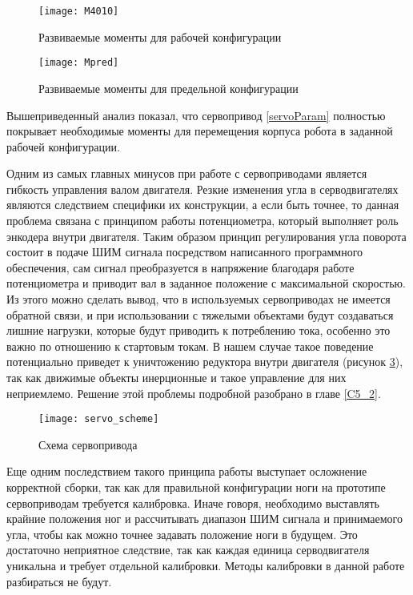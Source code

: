 \begin{figure}[h!]
	\begin{center}
		\texttt{[image: M4010]}
		\caption{Развиваемые моменты для рабочей конфигурации}
		\label{M4010}
	\end{center}
\end{figure}

\begin{figure}[h!]
	\begin{center}
		\texttt{[image: Mpred]}
		\caption{Развиваемые моменты для предельной конфигурации}
		\label{Mpred}
	\end{center}
\end{figure}


Вышеприведенный анализ показал, что сервопривод \ref{servoParam} полностью покрывает необходимые моменты для перемещения корпуса робота в заданной рабочей конфигурации.
 
Одним из самых главных минусов при работе с сервоприводами является гибкость управления валом двигателя. Резкие изменения угла в серводвигателях являются следствием специфики их конструкции, а если быть точнее, то данная проблема связана с принципом работы потенциометра, который выполняет роль энкодера внутри двигателя. Таким образом принцип регулирования угла поворота состоит в подаче ШИМ сигнала посредством написанного программного обеспечения, сам сигнал преобразуется в напряжение благодаря работе потенциометра и приводит вал в заданное положение с максимальной скоростью. Из этого можно сделать вывод, что в используемых  сервоприводах не имеется обратной связи, и при использовании с тяжелыми объектами будут создаваться лишние нагрузки, которые будут приводить к потреблению тока, особенно это важно по отношению к стартовым токам. В нашем случае такое поведение потенциально приведет к уничтожению редуктора внутри двигателя (рисунок \ref{servo_scheme}), так как движимые объекты инерционные и такое управление для них неприемлемо. Решение этой проблемы подробной разобрано в главе \ref{C5_2}. 

\begin{figure}[h!]
	\begin{center}
		\texttt{[image: servo\_scheme]}
		\caption{Схема сервопривода}
		\label{servo_scheme}
	\end{center}
\end{figure}

Еще одним последствием такого принципа работы выступает осложнение корректной сборки, так как для правильной конфигурации ноги на прототипе сервоприводам требуется калибровка. Иначе говоря, необходимо выставлять крайние положения ног и рассчитывать диапазон ШИМ сигнала и принимаемого угла, чтобы как можно точнее задавать положение ноги в будущем. Это достаточно неприятное следствие, так как каждая единица серводвигателя уникальна и требует отдельной калибровки. Методы калибровки в данной работе разбираться не будут.

